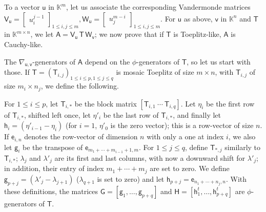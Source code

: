 \documentclass[sigconf]{acmart}
\newcommand{\ve}{\ensuremath{\mathsf{e}}}
\newcommand{\vg}{\ensuremath{\mathsf{g}}}
\newcommand{\vh}{\ensuremath{\mathsf{h}}}
\newcommand{\vu}{\ensuremath{\mathsf{u}}}
\newcommand{\vv}{\ensuremath{\mathsf{v}}}
\newcommand{\mA}{\ensuremath{\mathsf{A}}}
\newcommand{\mG}{\ensuremath{\mathsf{G}}}
\newcommand{\mH}{\ensuremath{\mathsf{H}}}
\newcommand{\mT}{\ensuremath{\mathsf{T}}}
\newcommand{\mV}{\ensuremath{\mathsf{V}}}
\newcommand{\mW}{\ensuremath{\mathsf{W}}}
\newcommand{\K}{\ensuremath{\mathbb{K}}}
\theoremstyle{acmdefinition}
\begin{document}
To a vector $\vu$ in $\K^m$, let us  associate the
corresponding Vandermonde matrices
$
\mV_\vu = \left[\begin{smallmatrix}
u_i^{j-1}
\end{smallmatrix}\right]_{1 \leq i,j \leq m},
\mW_\vu = \left[\begin{smallmatrix}
u_j^{m-i}
\end{smallmatrix}\right]_{1 \leq i,j \leq m}.
$
%
For $\vu$ as above, $\vv$ in $\K^n$ and $\mT$ in $\K^{m\times n}$, we
let $\mA = \mV_\vu\, \mT\, \mW_\vv$; we now prove that if $\mT$ is
Toeplitz-like, $\mA$ is Cauchy-like.

The $\nabla_{\vu,\vv}$-generators of $\mA$ depend on the
$\phi$-generators of $\mT$, so let us start with those. If
$\mT=(\mT_{i,j})_{1 \le i \le p,1 \le j \le q}$ is mosaic Toeplitz of
size $m \times n$, with $\mT_{i,j}$ of size $m_i \times n_j$, we
define the following.

For $1 \le i \le p$, let $\mT_{i,*}$ be the block matrix
$[\mT_{i,1}~\cdots~\mT_{i,q}]$.  Let $\eta_i$ be the first row of
$\mT_{i,*}$, shifted left once, let $\eta'_i$ be the last row of
$\mT_{i,*}$, and finally let $\vh_i=(\eta'_{i-1}-\eta_i)$ (for $i=1$,
$\eta'_0$ is the zero vector); this is a row-vector of size $n$. If
$\ve_{i,n}$ denotes the row-vector of dimension $n$ with only a one at
index $i$, we also let $\vg_{i}$ be the transpose of
$\ve_{m_1 + \cdots +m_{i-1}+1,m}$.  For $1 \le j \le q$, define
$\mT_{*,j}$ similarly to $\mT_{i,*}$; $\lambda_j$ and $\lambda'_j$ are
its first and last columns, with now a downward shift for
$\lambda'_j$; in addition, their entry of index $m_1 + \cdots + m_j$
are set to zero. We define $\vg_{p+j}=(\lambda'_{j}-\lambda_{j+1})$
($\lambda_{q+1}$ is set to zero) and let
$\vh_{p+j}=\ve_{n_1 + \cdots +n_j,n}$.  With these definitions, the
matrices $\mG=[ \vg_1, \dots, \vg_{p+q} ]$ and
$\mH=[\vh^t_1, \dots, \vh^t_{p+q}]$ are $\phi$-generators of $\mT$.
\end{document}
